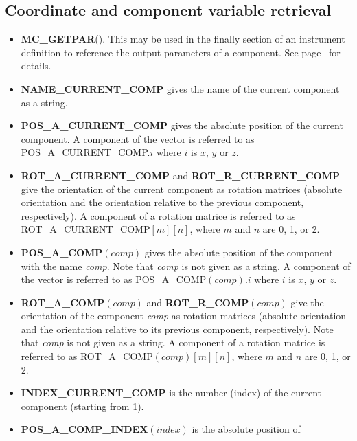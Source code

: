 \subsection{Coordinate and component variable retrieval}
\begin{itemize}
\item {\bf MC\_GETPAR}(). This may be used in the finally section of an
  instrument definition to reference the output parameters of a
  component. See page~\pageref{mcgetpar} for details.
\item {\bf NAME\_CURRENT\_COMP} gives the name of the current component as a string.
\item {\bf POS\_A\_CURRENT\_COMP} gives the absolute position of the 
  current component. A component of the vector is referred to as
  POS\_A\_CURRENT\_COMP.$i$ where $i$ is $x$, $y$ or $z$.
\item {\bf ROT\_A\_CURRENT\_COMP} and 
  {\bf ROT\_R\_CURRENT\_COMP} give the orientation
  of the current component as rotation matrices
  (absolute orientation and the orientation relative to
  the previous component, respectively). A
  component of a rotation matrice is referred to as 
  ROT\_A\_CURRENT\_COMP$[m][n]$, where $m$ and
  $n$ are 0, 1, or 2.
\item {\bf POS\_A\_COMP}$(comp)$ gives the absolute position
  of the component with the name {\em comp}. Note that
  {\em comp} is not given as a string. A component of the
  vector is referred to as POS\_A\_COMP$(comp).i$
  where $i$ is $x$, $y$ or $z$.
\item {\bf ROT\_A\_COMP}$(comp)$ and
  {\bf ROT\_R\_COMP}$(comp)$ give the orientation of the
  component {\em comp} as rotation matrices (absolute
  orientation and the orientation relative to its
  previous component, respectively). Note that {\em comp}
  is not given as a string. A component of  a rotation
  matrice is referred to as 
  ROT\_A\_COMP$(comp)[m][n]$, where $m$ and $n$ are
  0, 1, or 2. 
\item {\bf INDEX\_CURRENT\_COMP} is the number (index) of the
       current component  (starting from 1).
\item {\bf POS\_A\_COMP\_INDEX}$(index)$ is the absolute position of

\end{itemize}

